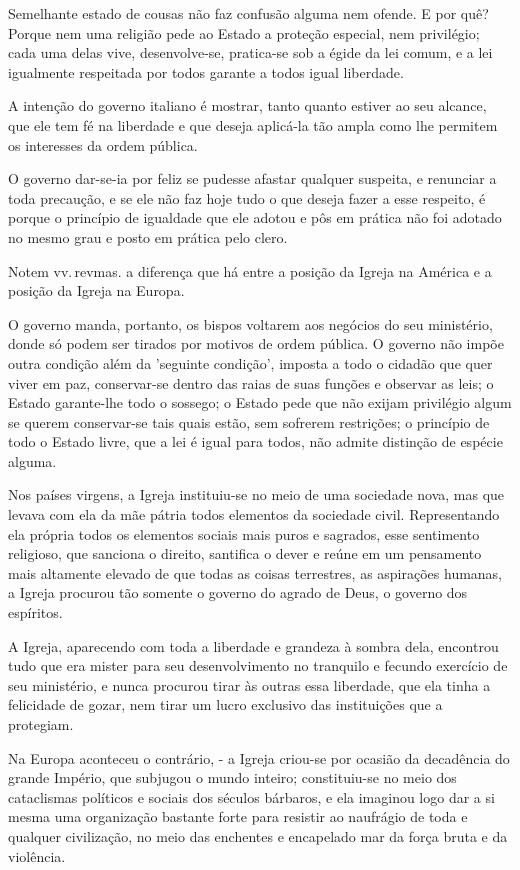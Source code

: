 Semelhante estado de cousas não faz confusão alguma nem ofende. E por
quê? Porque nem uma religião pede ao Estado a proteção especial, nem
privilégio; cada uma delas vive, desenvolve-se, pratica-se sob a égide
da lei comum, e a lei igualmente respeitada por todos garante a todos
igual liberdade.

A intenção do governo italiano é mostrar, tanto quanto estiver ao seu
alcance, que ele tem fé na liberdade e que deseja aplicá-la tão ampla
como lhe permitem os interesses da ordem pública.

O governo dar-se-ia por feliz se pudesse afastar qualquer suspeita, e
renunciar a toda precaução, e se ele não faz hoje tudo o que deseja
fazer a esse respeito, é porque o princípio de igualdade que ele adotou
e pôs em prática não foi adotado no mesmo grau e posto em prática pelo
clero.

Notem vv.\,revmas. a diferença que há entre a posição da Igreja na
América e a posição da Igreja na Europa.

O governo manda, portanto, os bispos voltarem aos negócios do seu
ministério, donde só podem ser tirados por motivos de ordem pública. O
governo não impõe outra condição além da 'seguinte condição', imposta a
todo o cidadão que quer viver em paz, conservar-se dentro das raias de
suas funções e observar as leis; o Estado garante-lhe todo o sossego; o
Estado pede que não exijam privilégio algum se querem conservar-se tais
quais estão, sem sofrerem restrições; o princípio de todo o Estado
livre, que a lei é igual para todos, não admite distinção de espécie
alguma.

Nos países virgens, a Igreja instituiu-se no meio de uma sociedade nova,
mas que levava com ela da mãe pátria todos elementos da sociedade civil.
Representando ela própria todos os elementos sociais mais puros e
sagrados, esse sentimento religioso, que sanciona o direito, santifica o
dever e reúne em um pensamento mais altamente elevado de que todas as
coisas terrestres, as aspirações humanas, a Igreja procurou tão somente
o governo do agrado de Deus, o governo dos espíritos.

A Igreja, aparecendo com toda a liberdade e grandeza à sombra dela,
encontrou tudo que era mister para seu desenvolvimento no tranquilo e
fecundo exercício de seu ministério, e nunca procurou tirar às outras
essa liberdade, que ela tinha a felicidade de gozar, nem tirar um lucro
exclusivo das instituições que a protegiam.

Na Europa aconteceu o contrário, - a Igreja criou-se por ocasião da
decadência do grande Império, que subjugou o mundo inteiro;
constituiu-se no meio dos cataclismas políticos e sociais dos séculos
bárbaros, e ela imaginou logo dar a si mesma uma organização bastante
forte para resistir ao naufrágio de toda e qualquer civilização, no meio
das enchentes e encapelado mar da força bruta e da violência.

